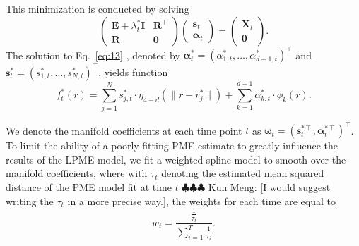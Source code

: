 \documentclass[11pt,reqno]{article}
\newcommand{\T}{\intercal}
\newcommand{\meng}[1]{{\color{purple} \sf $\clubsuit\clubsuit\clubsuit$ Kun Meng: [#1]}}
\theoremstyle{definition}
\begin{document}
This minimization is conducted by solving
\begin{equation}
  \left(
    \begin{array}{cc}
      \boldsymbol{E} + \lambda_t^* \boldsymbol{I} & \boldsymbol{R}^\T \\
      \boldsymbol{R} & \boldsymbol{0}
    \end{array}
  \right)\left(
    \begin{array}{c}
      \boldsymbol{s}_t \\
      \boldsymbol{\alpha}_t
    \end{array}
  \right) = \left(
    \begin{array}{c}
      \boldsymbol{X}_t \\
      \boldsymbol{0}
    \end{array}
  \right). \label{eq:13}
\end{equation}
The solution to Eq.~\eqref{eq:13} , denoted by $\boldsymbol{\alpha}^*_t=(\alpha^*_{1,t},\ldots,\alpha^*_{d+1,t})^\T$ and $\boldsymbol{s}^*_t=(s^*_{1,t},\ldots,s^*_{N,t})^\T$, yields function
\begin{equation}
  f_t^*(r) = \sum_{j=1}^{N}s_{j,t}^* \cdot  \eta_{4-d}\left(\|r - r_j^*\|\right) + \sum_{k=1}^{d + 1}\alpha_{k,t}^* \cdot \phi_k(r). \label{eq:14}
\end{equation}

We denote the manifold coefficients at each time point $t$ as $\boldsymbol{\omega}_t = (\boldsymbol{s}_t^{*\T}, \boldsymbol{\alpha}_t^{*\T})^\T$. To limit the ability of a poorly-fitting PME estimate to greatly influence the results of the LPME model, we fit a weighted spline model to smooth over the manifold coefficients, where with $\tau_t$ denoting the estimated mean squared distance of the PME model fit at time $t$ \meng{I would suggest writing the $\tau_t$ in a more precise way.}, the weights for each time are equal to 
$$w_t = \frac{\frac{1}{\tau_t}}{\sum_{i=1}^{T}\frac{1}{\tau_i}}.$$ 
\end{document}
